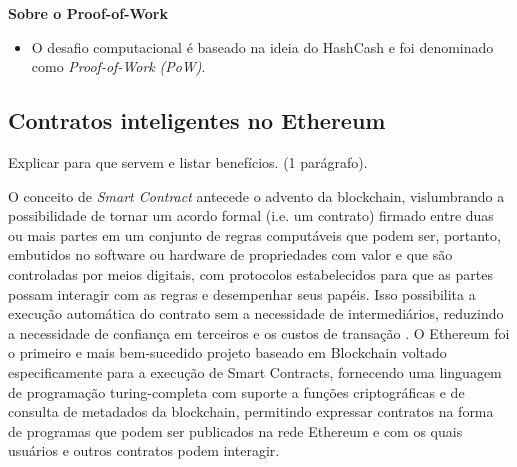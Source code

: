 \documentclass[a4paper,11pt]{article}
\begin{document}
 \textbf{Sobre o Proof-of-Work}

\begin{itemize}
    \item O desafio computacional é baseado na ideia do HashCash \cite{Back2002} e foi denominado como \emph{Proof-of-Work} \emph{(PoW)}.
\end{itemize}
\subsection{Contratos inteligentes no Ethereum} \label{sub:sec:contratos-ethereum}

{\color{ForestGreen}Explicar para que servem e listar benefícios. (1 parágrafo).}

O conceito de \emph{Smart Contract} antecede o advento da blockchain, vislumbrando a possibilidade  de tornar um acordo formal (i.e. um contrato) firmado entre duas ou mais partes em um conjunto de regras computáveis que podem ser, portanto, embutidos no software ou hardware de propriedades com valor e que são controladas por meios digitais, com protocolos estabelecidos para que as partes possam interagir com as regras e desempenhar seus papéis.
Isso possibilita a execução automática do contrato sem a necessidade de intermediários, reduzindo a necessidade de confiança em terceiros e os custos de transação \cite{Bartoletti2019, Szabo1996}.
O Ethereum foi o primeiro e mais bem-sucedido projeto baseado em Blockchain voltado especificamente para a execução de Smart Contracts, fornecendo uma linguagem de programação turing-completa com suporte a funções criptográficas e de consulta de metadados da blockchain, permitindo expressar contratos na forma de programas que podem ser publicados na rede Ethereum e com os quais usuários e outros contratos podem interagir.
\end{document}
